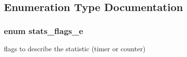 \subsection{Enumeration Type Documentation}
\hypertarget{group__STATS__GATHERING_ga438c2840cc2d516238ea3eb0f4c116b3}{
\subsubsection[{stats\-\_\-flags\-\_\-e}]{\setlength{\rightskip}{0pt plus 5cm}enum {\bf stats\-\_\-flags\-\_\-e}}}\label{group__STATS__GATHERING_ga438c2840cc2d516238ea3eb0f4c116b3}


flags to describe the statistic (timer or counter) 

